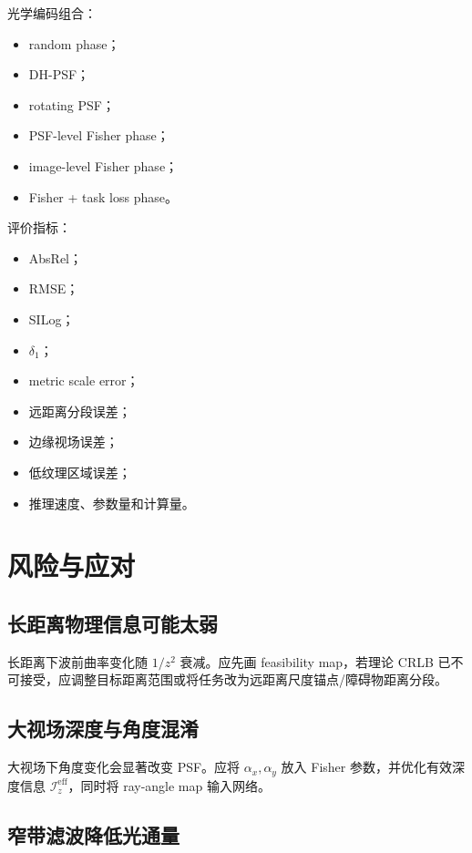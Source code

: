 \documentclass[11pt,a4paper,fontset=none]{ctexart}
\begin{document}
光学编码组合：
\begin{itemize}
  \item random phase；
  \item DH-PSF；
  \item rotating PSF；
  \item PSF-level Fisher phase；
  \item image-level Fisher phase；
  \item Fisher + task loss phase。
\end{itemize}

评价指标：
\begin{itemize}
  \item AbsRel；
  \item RMSE；
  \item SILog；
  \item $\delta_1$；
  \item metric scale error；
  \item 远距离分段误差；
  \item 边缘视场误差；
  \item 低纹理区域误差；
  \item 推理速度、参数量和计算量。
\end{itemize}

\section{风险与应对}

\subsection{长距离物理信息可能太弱}

长距离下波前曲率变化随 $1/z^2$ 衰减。应先画 feasibility map，若理论 CRLB 已不可接受，应调整目标距离范围或将任务改为远距离尺度锚点/障碍物距离分段。

\subsection{大视场深度与角度混淆}

大视场下角度变化会显著改变 PSF。应将 $\alpha_x,\alpha_y$ 放入 Fisher 参数，并优化有效深度信息 $\mathcal I_z^{\mathrm{eff}}$，同时将 ray-angle map 输入网络。

\subsection{窄带滤波降低光通量}
\end{document}
